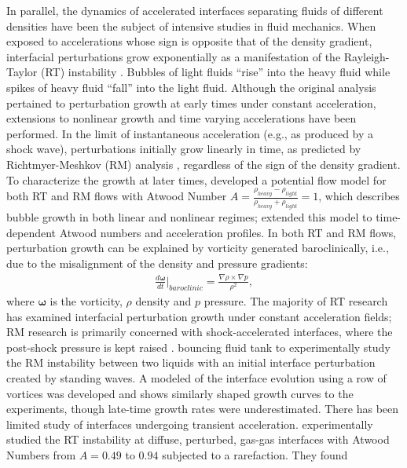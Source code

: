 \documentclass{jfm}%
\begin{document}
In parallel, the dynamics of accelerated interfaces separating fluids
of different densities have been the subject of intensive studies in
fluid mechanics. When exposed to accelerations whose sign is opposite
that of the density gradient, interfacial perturbations grow
exponentially as a manifestation of the Rayleigh-Taylor (RT)
instability \citep{Taylor1950}. Bubbles of light fluids ``rise'' into
the heavy fluid while spikes of heavy fluid ``fall'' into the light
fluid. Although the original analysis pertained to perturbation growth
at early times under constant acceleration, extensions to nonlinear
growth and time varying accelerations have been performed. In the
limit of instantaneous acceleration (e.g., as produced by a shock
wave), perturbations initially grow linearly in time, as predicted by
Richtmyer-Meshkov (RM) analysis \citep{Richtmyer1960, Meshkov1969},
regardless of the sign of the density gradient. To characterize the
growth at later times, \cite{Hecht1994} developed a potential flow
model for both RT and RM flows with Atwood Number
$A=\frac{\rho_{heavy}-\rho_{light}}{\rho_{heavy}+\rho_{light}}=1$,
which describes bubble growth in both linear and nonlinear regimes;
\cite{Srebro2003} extended this model to time-dependent Atwood numbers
and acceleration profiles. In both RT and RM flows, perturbation
growth can be explained by vorticity generated baroclinically, i.e.,
due to the misalignment of the density and pressure gradients:
\begin{align}
  \label{eq:baroclinic_equation}
  \frac{d\boldsymbol{\omega}}{dt} \biggr\rvert_{baroclinic} = \frac{\nabla \rho \times \nabla p}{\rho^2},%
\end{align}
where $\boldsymbol{\omega}$ is the vorticity, $\rho$ density and $p$
pressure. The majority of RT research has examined interfacial
perturbation growth under constant acceleration fields; RM research is
primarily concerned with shock-accelerated interfaces, where the
post-shock pressure is kept raised
\citep{Brouillette2002}. \citep{Jacobs1996} bouncing fluid tank to
experimentally study the RM instability between two liquids with an
initial interface perturbation created by standing waves. A modeled of
the interface evolution using a row of vortices was developed and
shows similarly shaped growth curves to the experiments, though
late-time growth rates were underestimated. There has been limited
study of interfaces undergoing transient
acceleration. \citep{Morgan2016} experimentally studied the RT
instability at diffuse, perturbed, gas-gas interfaces with Atwood
Numbers from $A=0.49$ to $0.94$ subjected to a rarefaction. They found
\end{document}
